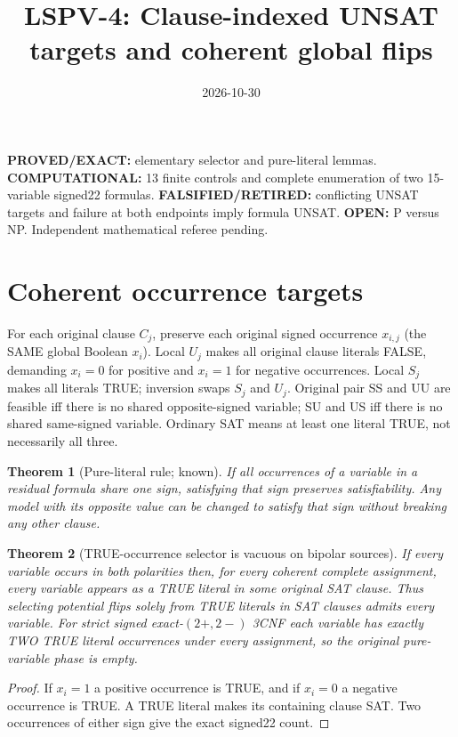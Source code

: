 \documentclass[10pt]{article}
\title{LSPV-4: Clause-indexed UNSAT targets and coherent global flips}
\date{2026-10-30}
\newtheorem{theorem}{Theorem}
\begin{document}
\maketitle
\noindent\textbf{PROVED/EXACT:} elementary selector and pure-literal lemmas. \textbf{COMPUTATIONAL:} 13 finite controls and complete enumeration of two 15-variable signed22 formulas. \textbf{FALSIFIED/RETIRED:} conflicting UNSAT targets and failure at both endpoints imply formula UNSAT. \textbf{OPEN:} P versus NP. Independent mathematical referee pending.
\section{Coherent occurrence targets}
For each original clause $C_j$, preserve each original signed occurrence $x_{i,j}$ (the SAME global Boolean $x_i$). Local $U_j$ makes all original clause literals FALSE, demanding $x_i=0$ for positive and $x_i=1$ for negative occurrences. Local $S_j$ makes all literals TRUE; inversion swaps $S_j$ and $U_j$. Original pair SS and UU are feasible iff there is no shared opposite-signed variable; SU and US iff there is no shared same-signed variable. Ordinary SAT means at least one literal TRUE, not necessarily all three.
\begin{theorem}[Pure-literal rule; known]
If all occurrences of a variable in a residual formula share one sign, satisfying that sign preserves satisfiability. Any model with its opposite value can be changed to satisfy that sign without breaking any other clause.
\end{theorem}
\begin{theorem}[TRUE-occurrence selector is vacuous on bipolar sources]
If every variable occurs in both polarities then, for every coherent complete assignment, every variable appears as a TRUE literal in some original SAT clause. Thus selecting potential flips solely from TRUE literals in SAT clauses admits every variable. For strict signed exact-$(2+,2-)$ 3CNF each variable has exactly TWO TRUE literal occurrences under every assignment, so the original pure-variable phase is empty.
\end{theorem}
\begin{proof}If $x_i=1$ a positive occurrence is TRUE, and if $x_i=0$ a negative occurrence is TRUE. A TRUE literal makes its containing clause SAT. Two occurrences of either sign give the exact signed22 count.\end{proof}
\end{document}
